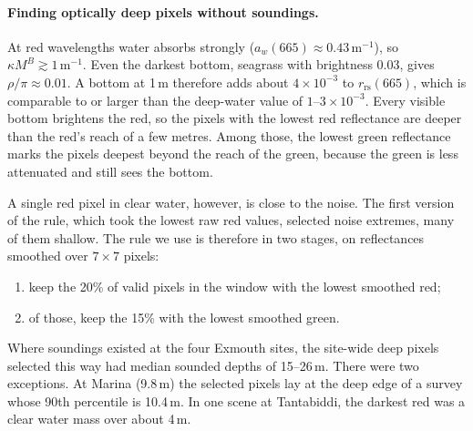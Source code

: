 \documentclass[remotesensing,article,submit,pdftex]{Definitions/mdpi}
\begin{document}
\paragraph{Finding optically deep pixels without soundings.} At red wavelengths water absorbs strongly ($a_w(665) \approx 0.43\,\mathrm{m}^{-1}$), so $\kappa M^B \gtrsim 1\,\mathrm{m}^{-1}$. Even the darkest bottom, seagrass with brightness 0.03, gives $\rho/\pi \approx 0.01$. A bottom at 1\,m therefore adds about $4 \times 10^{-3}$ to $r_\mathrm{rs}(665)$, which is comparable to or larger than the deep-water value of $1$--$3 \times 10^{-3}$. Every visible bottom brightens the red, so the pixels with the lowest red reflectance are deeper than the red's reach of a few metres. Among those, the lowest green reflectance marks the pixels deepest beyond the reach of the green, because the green is less attenuated and still sees the bottom.

A single red pixel in clear water, however, is close to the noise. The first version of the rule, which took the lowest raw red values, selected noise extremes, many of them shallow. The rule we use is therefore in two stages, on reflectances smoothed over $7 \times 7$ pixels:
\begin{enumerate}
\item keep the 20\% of valid pixels in the window with the lowest smoothed red;
\item of those, keep the 15\% with the lowest smoothed green.
\end{enumerate}
Where soundings existed at the four Exmouth sites, the site-wide deep pixels selected this way had median sounded depths of 15--26\,m. There were two exceptions. At Marina (9.8\,m) the selected pixels lay at the deep edge of a survey whose 90th percentile is 10.4\,m. In one scene at Tantabiddi, the darkest red was a clear water mass over about 4\,m.
\end{document}
